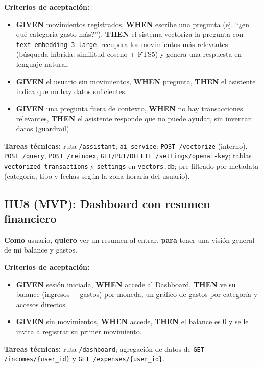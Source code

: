\documentclass[12pt,letterpaper]{article}
\begin{document}
\textbf{Criterios de aceptaci\'on:}
\begin{itemize}[leftmargin=1.2cm]
  \item \textbf{GIVEN} movimientos registrados, \textbf{WHEN} escribe una pregunta
        (ej. ``¿en qu\'e categor\'ia gasto m\'as?''), \textbf{THEN} el sistema
        vectoriza la pregunta con \texttt{text-embedding-3-large}, recupera los
        movimientos m\'as relevantes (b\'usqueda h\'ibrida: similitud coseno + FTS5)
        y genera una respuesta en lenguaje natural.
  \item \textbf{GIVEN} el usuario sin movimientos, \textbf{WHEN} pregunta,
        \textbf{THEN} el asistente indica que no hay datos suficientes.
  \item \textbf{GIVEN} una pregunta fuera de contexto, \textbf{WHEN} no hay
        transacciones relevantes, \textbf{THEN} el asistente responde que no puede
        ayudar, sin inventar datos (guardrail).
\end{itemize}
\textbf{Tareas t\'ecnicas:} ruta \texttt{/assistant}; \texttt{ai-service}:
\texttt{POST /vectorize} (interno), \texttt{POST /query}, \texttt{POST /reindex},
\texttt{GET/PUT/DELETE /settings/openai-key}; tablas \texttt{vectorized\_transactions}
y \texttt{settings} en \texttt{vectors.db}; pre-filtrado por metadata (categor\'ia,
tipo y fechas seg\'un la zona horaria del usuario).

\subsection{HU8 (MVP): Dashboard con resumen financiero}
\textbf{Como} usuario, \textbf{quiero} ver un resumen al entrar, \textbf{para} tener
una visi\'on general de mi balance y gastos.

\textbf{Criterios de aceptaci\'on:}
\begin{itemize}[leftmargin=1.2cm]
  \item \textbf{GIVEN} sesi\'on iniciada, \textbf{WHEN} accede al Dashboard,
        \textbf{THEN} ve su balance (ingresos $-$ gastos) por moneda, un gr\'afico de
        gastos por categor\'ia y accesos directos.
  \item \textbf{GIVEN} sin movimientos, \textbf{WHEN} accede, \textbf{THEN} el balance
        es 0 y se le invita a registrar su primer movimiento.
\end{itemize}
\textbf{Tareas t\'ecnicas:} ruta \texttt{/dashboard}; agregaci\'on de datos de
\texttt{GET /incomes/\{user\_id\}} y \texttt{GET /expenses/\{user\_id\}}.
\end{document}
